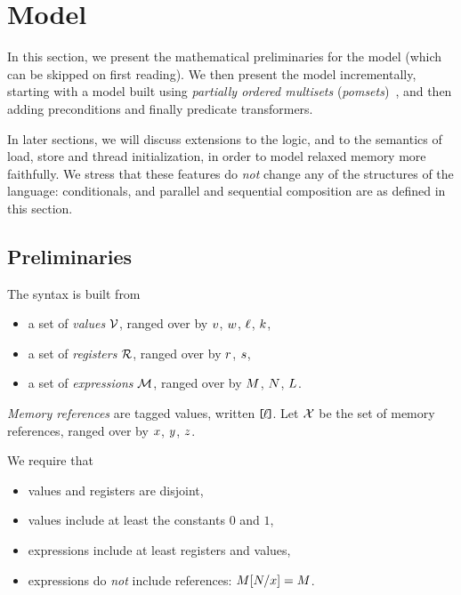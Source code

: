 \section{Model}
\label{sec:model}


In this section, we present the mathematical preliminaries for the
model (which can be skipped on first reading). We then present the
model incrementally, starting with a model built using
\emph{partially ordered multisets}
(\emph{pomsets})~\cite{GISCHER1988199,Plotkin:1997:TSP:266557.266600},
and then adding preconditions and finally predicate transformers.

In later sections, we will discuss extensions to the logic, and to the
semantics of load, store and thread initialization, in order to model
relaxed memory more faithfully. We stress that these features do
\emph{not} change any of the structures of the language: conditionals,
and parallel and sequential composition are as defined in this section.

\subsection{Preliminaries}
\label{sec:prelim}
The syntax is built from
\begin{itemize}
\item a set of \emph{values} $\mathcal{V}$, ranged over by
  $v$, $w$, $\ell$, $k$,
\item a set of \emph{registers} $\mathcal{R}$, ranged over by
  $r$, $s$,
\item a set of \emph{expressions} $\mathcal{M}$, ranged over by
  $M$, $N$,  $L$.
\end{itemize}

\emph{Memory references} are tagged values, written $\mkern-2mu\texttt{[}\mkern-2mu\ell \mkern-2mu\texttt{]}\mkern-2mu$.  Let $\mathcal{X}$
be the set of memory references, ranged over by $x$, $y$, $z$.

We require that
\begin{itemize}
\item values and registers are disjoint, 
\item values include at least the constants $0$ and $1$,  
\item expressions include at least registers and values, 
\item expressions do \emph{not} include references: $M[N/x]=M$.
\end{itemize}


